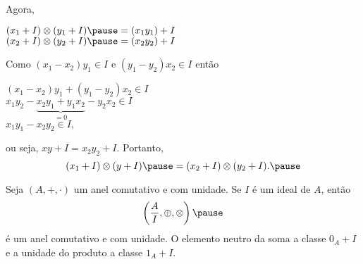 \documentclass{beamer}
\begin{document}
    \begin{frame}
        Agora,\pause 
        \begin{center}
            $(x_1 + I) \otimes (y_1 + I) \pause = (x_1y_1) + I$\pause\\
            $(x_2 + I) \otimes (y_2 + I) \pause = (x_2y_2) + I$\pause
        \end{center}

        Como $(x_1 - x_2)y_1 \in I$ \pause e $(y_1 - y_2)x_2 \in I$ \pause ent\~ao\pause
        \begin{center}
            $(x_1 - x_2)y_1 + (y_1 - y_2)x_2 \in I$\pause\\
            $x_1y_2-\underbrace{x_2y_1 + y_1x_2}_{= 0} - y_2x_2 \in I$\pause\\
            $x_1y_1 - x_2y_2\in I,$\pause 
        \end{center}
        ou seja, \pause $xy + I = x_2y_2 + I$. \pause Portanto,\pause 
        \[
            (x_1 + I) \otimes (y + I) \pause = (x_2 + I) \otimes (y_2 + I).\pause
        \]
    \end{frame}

    \begin{frame}
        \begin{teorema}
            Seja $(A, +, \cdot)$ um anel comutativo \pause e com unidade. \pause Se $I$ {\'e} um ideal de $A$, \pause ent\~ao
            \[
                \left(\dfrac{A}{I}, \oplus, \otimes\right)\pause 
            \]
            {\'e} um anel comutativo \pause e com unidade. \pause O elemento neutro da soma  a classe $0_{A} + I$ \pause e a unidade do produto  a classe $1_{A} + I$.\pause
        \end{teorema}
    \end{frame}
\end{document}
